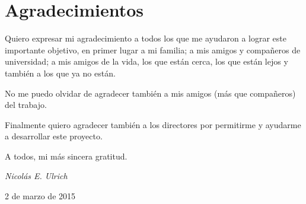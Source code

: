 

\bigskip

\begingroup
\let\clearpage\relax
\let\cleardoublepage\relax
\let\cleardoublepage\relax
\chapter*{Agradecimientos}

Quiero expresar mi agradecimiento a todos los que me ayudaron a lograr este importante objetivo, en primer lugar a mi familia; a mis amigos y compañeros de universidad; a mis amigos de la vida, los que están cerca, los que están lejos y también a los que ya no están.

No me puedo olvidar de agradecer también a mis amigos (más que compañeros) del trabajo.

Finalmente quiero agradecer también a los directores por permitirme y ayudarme a desarrollar este proyecto.

\bigskip

A todos, mi más sincera gratitud.

\bigskip

\bigskip

\hfill \emph{Nicolás E. Ulrich}

\hfill 2 de marzo de 2015


\endgroup



